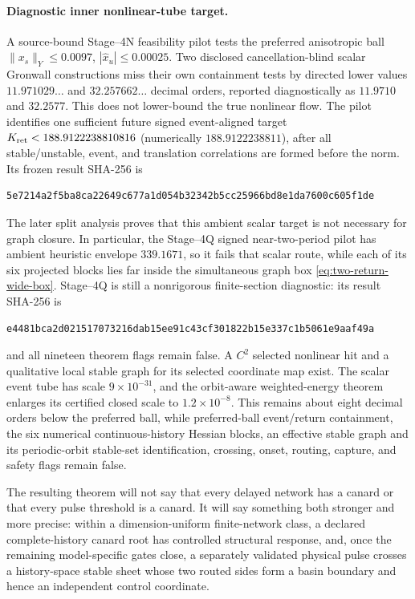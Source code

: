\paragraph{Diagnostic inner nonlinear-tube target.}
A source-bound Stage--4N feasibility pilot tests the preferred anisotropic
ball \(\|x_s\|_Y\le0.0097\), \(|\widehat x_u|\le0.00025\).  Two disclosed
cancellation-blind scalar Gronwall constructions miss their own containment
tests by directed lower values \(11.971029\ldots\) and
\(32.257662\ldots\) decimal orders, reported diagnostically as \(11.9710\)
and \(32.2577\).  This does not lower-bound the true nonlinear flow.  The
pilot identifies one sufficient future signed event-aligned target
\(K_{\rm ret}<188.9122238810816\) (numerically \(188.9122238811\)), after all
stable/unstable, event, and translation correlations are formed before the
norm.  Its frozen result SHA-256 is
\begin{verbatim}
5e7214a2f5ba8ca22649c677a1d054b32342b5cc25966bd8e1da7600c605f1de
\end{verbatim}
The later split analysis proves that this ambient scalar target is not
necessary for graph closure.  In particular, the Stage--4Q signed
near-two-period pilot has ambient heuristic envelope \(339.1671\), so it
fails that scalar route, while each of its six projected blocks lies far
inside the simultaneous graph box \cref{eq:two-return-wide-box}.  Stage--4Q
is still a nonrigorous finite-section diagnostic: its result SHA-256 is
\begin{verbatim}
e4481bca2d021517073216dab15ee91c43cf301822b15e337c1b5061e9aaf49a
\end{verbatim}
and all nineteen theorem flags remain false.  A \(C^2\) selected nonlinear
hit and a qualitative local stable graph for its selected coordinate map
exist.  The scalar event tube has scale \(9\times10^{-31}\), and the
orbit-aware weighted-energy theorem enlarges its certified closed scale to
\(1.2\times10^{-8}\).  This remains about eight decimal orders below the
preferred ball, while
preferred-ball event/return containment, the six numerical
continuous-history Hessian blocks, an effective stable graph and its
periodic-orbit stable-set identification, crossing, onset, routing, capture,
and safety flags remain false.

The resulting theorem will not say that every delayed network has a canard
or that every pulse threshold is a canard.  It will say something both
stronger and more precise: within a dimension-uniform finite-network class,
a declared complete-history canard root has controlled structural response,
and, once the remaining model-specific gates close, a separately validated
physical pulse crosses a history-space stable sheet whose two routed sides
form a basin boundary and hence an independent control coordinate.
